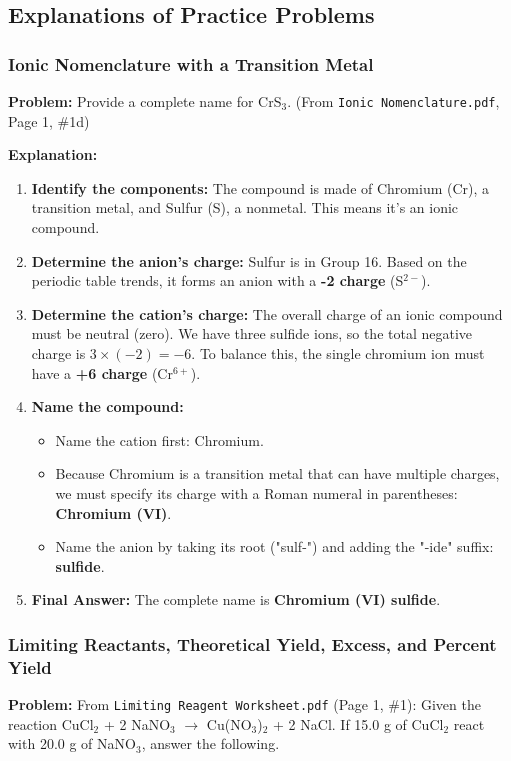 \documentclass{article}
\begin{document}
\bigskip
\subsection*{Explanations of Practice Problems}

\subsubsection*{Ionic Nomenclature with a Transition Metal}
\textbf{Problem:} Provide a complete name for CrS\(_3\). (From \texttt{Ionic Nomenclature.pdf}, Page 1, \#1d)

\textbf{Explanation:}
\begin{enumerate}[itemsep=5pt]
    \item \textbf{Identify the components:} The compound is made of Chromium (Cr), a transition metal, and Sulfur (S), a nonmetal. This means it's an ionic compound.
    \item \textbf{Determine the anion's charge:} Sulfur is in Group 16. Based on the periodic table trends, it forms an anion with a \textbf{-2 charge} (S\(^{2-}\)).
    \item \textbf{Determine the cation's charge:} The overall charge of an ionic compound must be neutral (zero). We have three sulfide ions, so the total negative charge is \(3 \times (-2) = -6\). To balance this, the single chromium ion must have a \textbf{+6 charge} (Cr\(^{6+}\)).
    \item \textbf{Name the compound:}
    \begin{itemize}
        \item Name the cation first: Chromium.
        \item Because Chromium is a transition metal that can have multiple charges, we must specify its charge with a Roman numeral in parentheses: \textbf{Chromium (VI)}.
        \item Name the anion by taking its root ("sulf-") and adding the "-ide" suffix: \textbf{sulfide}.
    \end{itemize}
    \item \textbf{Final Answer:} The complete name is \textbf{Chromium (VI) sulfide}.
\end{enumerate}

\bigskip
\subsubsection*{Limiting Reactants, Theoretical Yield, Excess, and Percent Yield}
\textbf{Problem:} From \texttt{Limiting Reagent Worksheet.pdf} (Page 1, \#1): Given the reaction CuCl\(_2\) + 2 NaNO\(_3\) \(\rightarrow\) Cu(NO\(_3\))\(_2\) + 2 NaCl. If 15.0 g of CuCl\(_2\) react with 20.0 g of NaNO\(_3\), answer the following.
\end{document}
